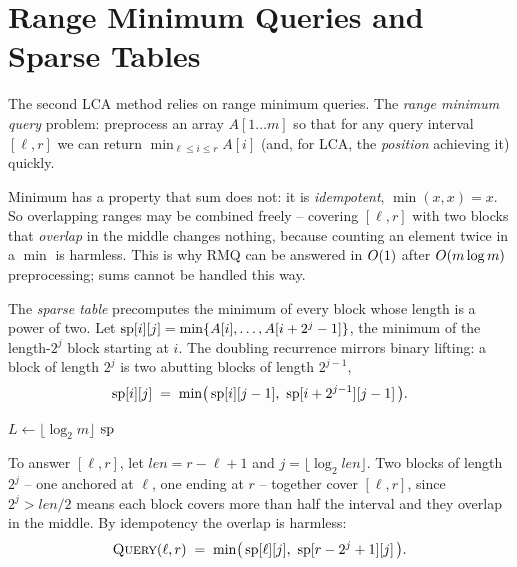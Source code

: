 \section{Range Minimum Queries and Sparse Tables}
\label{ch23:rmq}

The second LCA method relies on range minimum queries. The \emph{range minimum query} problem:
preprocess an array $A[1\ldots m]$ so that for any query interval $[\ell,r]$ we can return
$\min_{\ell\le i\le r} A[i]$ (and, for LCA, the \emph{position} achieving it) quickly.

\begin{intuitionbox}
Minimum has a property that sum does not: it is \emph{idempotent}, $\min(x,x)=x$. So
overlapping ranges may be combined freely -- covering $[\ell,r]$ with two blocks that
\emph{overlap} in the middle changes nothing, because counting an element twice in a $\min$
is harmless. This is why RMQ can be answered in $O(1)$ after $O(m\log m)$
preprocessing; sums cannot be handled this way.
\end{intuitionbox}

The \emph{sparse table} precomputes the minimum of every block whose length is a power of
two. Let $\mathrm{sp}[i][j]=\min\{A[i],\dots,A[i+2^j-1]\}$, the minimum of the length-$2^j$ block
starting at $i$. The doubling recurrence mirrors binary lifting: a block of length $2^j$ is
two abutting blocks of length $2^{j-1}$,
\begin{equation}
\spt[i][j] \;=\; \min\bigl(\,\spt[i][j-1],\ \spt[i+2^{j-1}][j-1]\,\bigr).
\label{ch23:spt-recur}
\end{equation}

\begin{algorithm}[H]
\DontPrintSemicolon
\caption{\textsc{BuildSparse}$(A,m)$}
$L \gets \lfloor\log_2 m\rfloor$\;
\Return $\mathrm{sp}$\;
\end{algorithm}

To answer $[\ell,r]$, let $\textit{len}=r-\ell+1$ and $j=\lfloor\log_2 \textit{len}\rfloor$.
Two blocks of length $2^j$ -- one anchored at $\ell$, one ending at $r$ -- together cover
$[\ell,r]$, since $2^j > \textit{len}/2$ means each block covers more than half the interval
and they overlap in the middle. By idempotency the overlap is harmless:
\begin{equation}
\textsc{Query}(\ell,r) \;=\; \min\bigl(\,\mathrm{sp}[\ell][j],\ \mathrm{sp}[r-2^j+1][j]\,\bigr).
\label{ch23:spt-query}
\end{equation}

